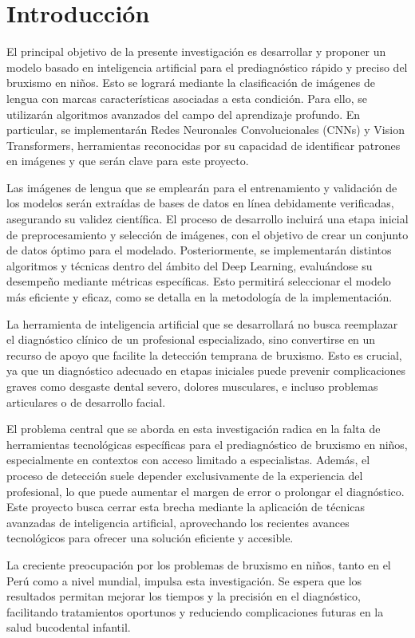 
\chapter*{Introducción}
El principal objetivo de la presente investigación es desarrollar y proponer un modelo basado en inteligencia artificial para el prediagnóstico rápido y preciso del bruxismo en niños. Esto se logrará mediante la clasificación de imágenes de lengua con marcas características asociadas a esta condición. Para ello, se utilizarán algoritmos avanzados del campo del aprendizaje profundo. En particular, se implementarán Redes Neuronales Convolucionales (CNNs) y Vision Transformers, herramientas reconocidas por su capacidad de identificar patrones en imágenes y que serán clave para este proyecto.

Las imágenes de lengua que se emplearán para el entrenamiento y validación de los modelos serán extraídas de bases de datos en línea debidamente verificadas, asegurando su validez científica. El proceso de desarrollo incluirá una etapa inicial de preprocesamiento y selección de imágenes, con el objetivo de crear un conjunto de datos óptimo para el modelado. Posteriormente, se implementarán distintos algoritmos y técnicas dentro del ámbito del Deep Learning, evaluándose su desempeño mediante métricas específicas. Esto permitirá seleccionar el modelo más eficiente y eficaz, como se detalla en la metodología de la implementación.

La herramienta de inteligencia artificial que se desarrollará no busca reemplazar el diagnóstico clínico de un profesional especializado, sino convertirse en un recurso de apoyo que facilite la detección temprana de bruxismo. Esto es crucial, ya que un diagnóstico adecuado en etapas iniciales puede prevenir complicaciones graves como desgaste dental severo, dolores musculares, e incluso problemas articulares o de desarrollo facial.

El problema central que se aborda en esta investigación radica en la falta de herramientas tecnológicas específicas para el prediagnóstico de bruxismo en niños, especialmente en contextos con acceso limitado a especialistas. Además, el proceso de detección suele depender exclusivamente de la experiencia del profesional, lo que puede aumentar el margen de error o prolongar el diagnóstico. Este proyecto busca cerrar esta brecha mediante la aplicación de técnicas avanzadas de inteligencia artificial, aprovechando los recientes avances tecnológicos para ofrecer una solución eficiente y accesible.

La creciente preocupación por los problemas de bruxismo en niños, tanto en el Perú como a nivel mundial, impulsa esta investigación. Se espera que los resultados permitan mejorar los tiempos y la precisión en el diagnóstico, facilitando tratamientos oportunos y reduciendo complicaciones futuras en la salud bucodental infantil.